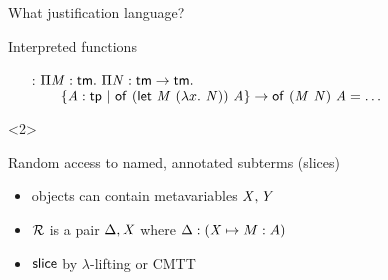 \documentclass{beamer}
\theoremstyle{example}
\begin{document}
\begin{frame}{What justification language?}
\begin{overlayarea}
\begin{onlyenv}
\begin{block}{Interpreted functions}
\begin{examples}
\begin{enumerate}[inline]
          \item[\const{inline} :] $\Pi{\ensuremath{\text{\textit{M}}}}:{\text{\textsf{tm}}}.\  \Pi{\ensuremath{\text{\textit{N}}}}:{\text{\textsf{tm}}\to\text{\textsf{tm}}}.\  $ $\qquad \{{\text{\textit{A}}}:{\text{\textsf{tp}}}\ |\ {{\text{\textsf{of}}}\  {(\text{\textsf{let}}\ {\text{\textit{M}}}\ {(\lambda{x}.\  \text{\textit{N}})})}\  {\text{\textit{A}}}}\} \to
            {\ensuremath{\text{\textsf{of}}}}\  {({\text{\textit{M}}}\  {\text{\textit{N}}})}\  {\text{\textit{A}}} =
            \ldots$
          \end{enumerate}
        \end{examples}
      \end{block}
    \end{onlyenv}
    \begin{onlyenv}<2>
      \begin{block}
        {Random access} to named, annotated subterms (slices)
        \begin{itemize}
        \item objects can contain metavariables $\text{\textit{X}}, \text{\textit{Y}}$
        \item $\mathcal{R}$ is a pair $\Delta, \text{\textit{X}}$ where $\Delta :
          (\text{\textit{X}}\mapsto M : A)$
        \item ${\rm\mathsf{slice}}$ by $\lambda$-lifting or CMTT
        \end{itemize}
      \end{block}
      \end{onlyenv}
    \end{overlayarea}

\end{frame}
\end{document}
